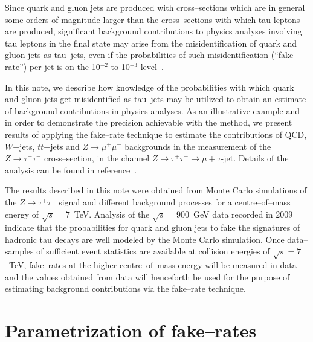 Since quark and gluon jets are produced with cross--sections which are in general some orders of magnitude larger
than the cross--sections with which tau leptons are produced, significant background contributions to physics analyses
involving tau leptons in the final state may arise from the misidentification of quark and gluon jets as tau--jets,
even if the probabilities of such misidentification (``fake--rate'') per jet 
is on the 10$^{-2}$ to 10$^{-3}$ level~\cite{PFlowTauReco, TaNCnote}.

In this note, we describe how knowledge of the probabilities with which quark and gluon jets get misidentified as tau--jets
may be utilized to obtain an estimate of background contributions in physics analyses.
As an illustrative example and in order to demonstrate the precision achievable with the method,
we present results of applying the fake--rate technique to estimate
the contributions of QCD, $W$+jets, $t\bar{t}$+jets and
$Z \rightarrow \mu^{+} \mu^{-}$ backgrounds in the measurement of the $Z \rightarrow \tau^{+} \tau^{-}$ cross--section,
in the channel $Z \rightarrow \tau^{+} \tau^{-} \rightarrow \mu + \tau\mbox{-jet}$.
Details of the analysis can be found in reference~\cite{EWKtauNote}.

The results described in this note were obtained from Monte Carlo simulations 
of the $Z \rightarrow \tau^{+} \tau^{-}$ signal and different background processes
for a centre--of--mass energy of $\sqrt{s} = 7$~TeV.
Analysis of the $\sqrt{s} = 900$~GeV data recorded in 2009~\cite{refFakeRate2009dataResults}
indicate that the probabilities for quark and gluon jets 
to fake the signatures of hadronic tau decays are well modeled by the Monte Carlo simulation.
Once data--samples of sufficient event statistics are available at collision energies of $\sqrt{s} = 7$~TeV,
fake--rates at the higher centre--of--mass energy will be measured in data
and the values obtained from data will henceforth be used for the purpose of estimating background contributions
via the fake--rate technique.


\section{Parametrization of fake--rates}
\label{secFakeRateParametrization}

